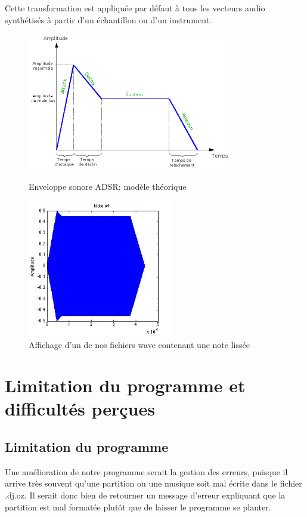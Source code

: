 \documentclass[10pt,a4paper]{article}
\begin{document}
Cette transformation est appliquée par défaut à tous les vecteurs audio synthétisés à partir d'un échantillon ou d'un instrument.

\begin{figure}[h!]
    \begin{minipage}[b]{0.4\linewidth}
        \centering \includegraphics[height=6cm]{images/ADSR.png}
        \caption{Enveloppe sonore ADSR: modèle théorique}
    \end{minipage}\hfill
    \begin{minipage}[b]{0.48\linewidth}
        \centering \includegraphics[height=6cm]{images/OurADSR.jpg}
        \caption{Affichage d'un de nos fichiers wave contenant une note lissée}
    \end{minipage}
\end{figure}

\section{Limitation du programme et difficultés perçues}
\subsection{Limitation du programme}
Une amélioration de notre programme serait la gestion des erreurs, 
puisque il arrive très souvent qu'une partition ou une musique soit mal écrite dans le fichier .dj.oz.
Il serait donc bien de retourner un message d'erreur expliquant que la partition est mal formatée 
plutôt que de laisser le programme se planter.
\end{document}
